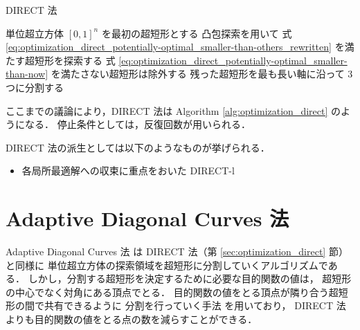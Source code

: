 \begin{algorithm}[tp]
    \caption{DIRECT 法}
    \label{alg:optimization_direct}
    \begin{algorithmic}
            \State 単位超立方体 $[0, 1]^n$ を最初の超短形とする
            \Loop
                \State 凸包探索を用いて
                    式 \eqref{eq:optimization_direct_potentially-optimal_smaller-than-others_rewritten}
                    を満たす超短形を探索する
                \State 式 \eqref{eq:optimization_direct_potentially-optimal_smaller-than-now}
                    を満たさない超短形は除外する
                \State 残った超短形を最も長い軸に沿って 3 つに分割する
                    \State \Return
                \EndIf
            \EndLoop
        \EndProcedure
    \end{algorithmic}
\end{algorithm}

ここまでの議論により，DIRECT 法は
Algorithm \ref{alg:optimization_direct} のようになる．
停止条件としては，反復回数が用いられる．

DIRECT 法の派生としては以下のようなものが挙げられる．

\begin{itemize}
    \item 各局所最適解への収束に重点をおいた DIRECT-l \cite{Gablonsky2001}
\end{itemize}

\section{Adaptive Diagonal Curves 法}

Adaptive Diagonal Curves 法 \cite{Sergeyev2006} は
DIRECT 法（第 \ref{sec:optimization_direct} 節）と同様に
単位超立方体の探索領域を超短形に分割していくアルゴリズムである．
しかし，分割する超短形を決定するために必要な目的関数の値は，
超短形の中心でなく対角にある頂点でとる．
目的関数の値をとる頂点が隣り合う超短形の間で共有できるように
分割を行っていく手法 \cite{Sergeyev2000} を用いており，
DIRECT 法よりも目的関数の値をとる点の数を減らすことができる．

